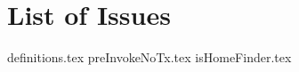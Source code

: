 \section{List of Issues} %
\label{sec:list_of_issues}
{definitions.tex}
{preInvokeNoTx.tex}
{isHomeFinder.tex}
